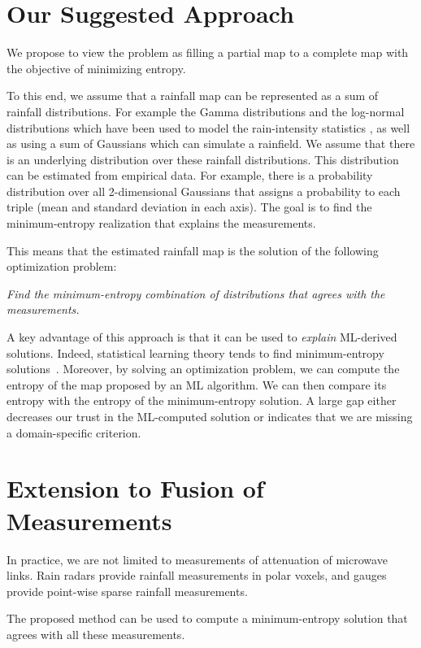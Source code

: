 \documentclass{article}
\begin{document}
\section{Our Suggested Approach}

We propose to view the problem as filling a partial map to a complete map with the objective of minimizing entropy.

To this end, we assume that a rainfall map can be represented as a sum of rainfall distributions. For example the Gamma distributions and the log-normal distributions which have been used to model the rain-intensity statistics \cite{GammaLog}, as well as using a sum of Gaussians which can simulate a rainfield. We assume that there is an underlying distribution over these rainfall distributions. This distribution can be estimated from empirical data. For example, there is a probability distribution over all 2-dimensional Gaussians that assigns a probability to each triple (mean and standard deviation in each axis). The goal is to find the minimum-entropy realization that explains the measurements.

This means that the estimated rainfall map is the solution of the following optimization problem:
\begin{center}
\textit{Find the minimum-entropy combination of distributions that agrees with the measurements.}
\end{center}

A key advantage of this approach is that it can be used to \emph{explain} ML-derived solutions. Indeed, statistical learning theory tends to find minimum-entropy solutions~\cite{grandvalet2005entropy}. Moreover, by solving an optimization problem, we can compute the entropy of the map proposed by an ML algorithm. We can then compare its entropy with the entropy of the minimum-entropy solution. A large gap either decreases our trust in the ML-computed solution or indicates that we are missing a domain-specific criterion.

\section{Extension to Fusion of Measurements}

In practice, we are not limited to measurements of attenuation of microwave links. Rain radars provide rainfall measurements in polar voxels, and gauges provide point-wise sparse rainfall measurements.

The proposed method can be used to compute a minimum-entropy solution that agrees with all these measurements.
\end{document}
